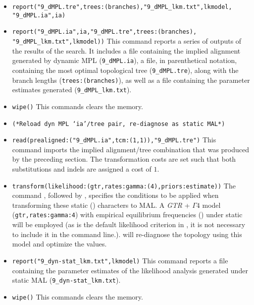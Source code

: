 \begin{itemize}
\item \texttt{report("9\_dMPL.tre",trees:(branches),"9\_dMPL\_lkm.txt",lkmodel,
"9\_dMPL.ia",ia)}

\item \texttt{report("9\_dMPL.ia",ia,"9\_dMPL.tre",trees:(branches),\\ "9\_dMPL\_lkm.txt",lkmodel))} 
This command reports a series of outputs of the results of the search.
It includes a file containing the implied alignment generated by dynamic MPL (\texttt{9\_dMPL.ia}), 
a file, in parenthetical notation, containing the most optimal topological tree (\texttt{9\_dMPL.tre}), 
along with the branch lengths (\texttt{trees:(branches)}), as well as a file containing the parameter 
estimates generated (\texttt{9\_dMPL\_lkm.txt}).

\item \texttt{wipe()} This commands clears the memory.

\item \texttt{(*Reload dyn MPL `ia'/tree pair, re-diagnose as static MAL*)}
\item \texttt{read(prealigned:("9\_dMPL.ia",tcm:(1,1)),"9\_dMPL.tre")} This \\ command 
imports the implied alignment/tree combination that was produced by the preceding section. 
The transformation costs are set such that both substitutions and indels are assigned a cost of $1$.
\item \texttt{transform(likelihood:(gtr,rates:gamma:(4),priors:estimate))} The command 
, followed by , specifies the conditions to 
be applied when transforming these static () characters to MAL. 
A \emph{GTR} + $\Gamma 4$ model (\texttt{gtr,rates:gamma:4}) 
with empirical equilibrium frequencies () under static  
will be employed (as  is the default likelihood criterion in \poy, it is not necessary to 
include it in the command line.). \poy will re-diagnose the topology using this model and optimize the values.
\item \texttt{report("9\_dyn-stat\_lkm.txt",lkmodel)} This command reports a file containing the parameter 
estimates of the likelihood analysis generated under static MAL (\texttt{9\_dyn-stat\_lkm.txt}).
\item \texttt{wipe()} This commands clears the memory.


\end{itemize}
